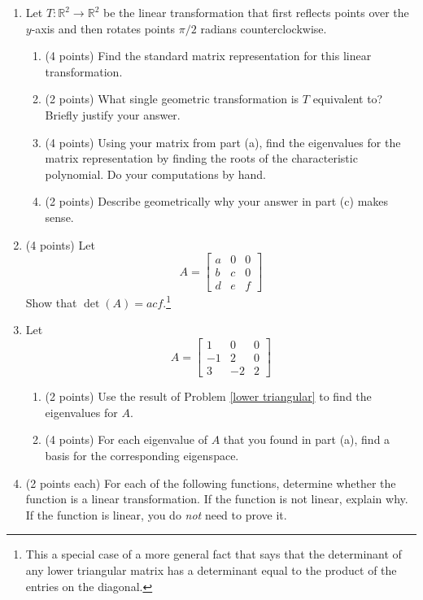 \documentclass[11pt]{article}
\theoremstyle{definition}
\begin{document}
\begin{enumerate}
\item Let $T: \mathbb{R}^2 \to \mathbb{R}^2$ be the linear transformation that first reflects points over the $y$-axis and then rotates points $\pi/2$ radians counterclockwise.  

\begin{enumerate}
\item (4 points) Find the standard matrix representation for this linear transformation.
    
\item (2 points) What single geometric transformation is $T$ equivalent to?  Briefly justify your answer.

\item (4 points) Using your matrix from part (a), find the eigenvalues for the matrix representation by finding the roots of the characteristic polynomial.  Do your computations by hand.

\item (2 points) Describe geometrically why your answer in part (c) makes sense.

\end{enumerate}

\item \label{lower triangular} (4 points) Let
\[
A=\begin{bmatrix} a & 0 & 0\\ b & c & 0 \\ d & e & f \end{bmatrix}
\]
Show that $\det(A)=acf$.\footnote{This a special case of a more general fact that says that the determinant of any lower triangular matrix has a determinant equal to the product of the entries on the diagonal.}

\item Let 
\[
A=\begin{bmatrix} 1 & 0 & 0\\ -1 & 2 & 0 \\ 3 & -2 & 2 \end{bmatrix}
\]
\begin{enumerate}
\item (2 points) Use the result of Problem \ref{lower triangular} to find the eigenvalues for $A$.

\item (4 points) For each eigenvalue of $A$ that you found in part (a), find a basis for the corresponding eigenspace.

\end{enumerate}

\item (2 points each) For each of the following functions, determine whether the function is a linear transformation.  If the function is not linear, explain why. If the function is linear, you do \emph{not} need to prove it.


\end{enumerate}
\end{document}
